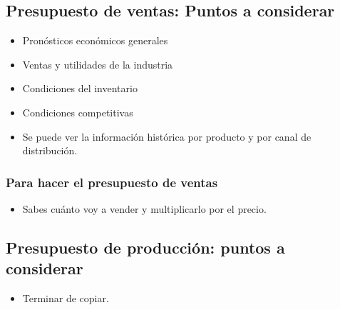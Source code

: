 \subsection{Presupuesto de ventas: Puntos a considerar}
\begin{itemize}
    \item Pronósticos económicos generales
    \item Ventas y utilidades de la industria 
    \item Condiciones del inventario 
    \item Condiciones competitivas 
    \item Se puede ver la información histórica por producto y por canal de distribución.
\end{itemize}

\subsubsection{Para hacer el presupuesto de ventas}
\begin{itemize}
    \item Sabes cuánto voy a vender y multiplicarlo por el precio.
\end{itemize}



\subsection{Presupuesto de producción: puntos a considerar}
\begin{itemize}
    \item Terminar de copiar.
\end{itemize}
